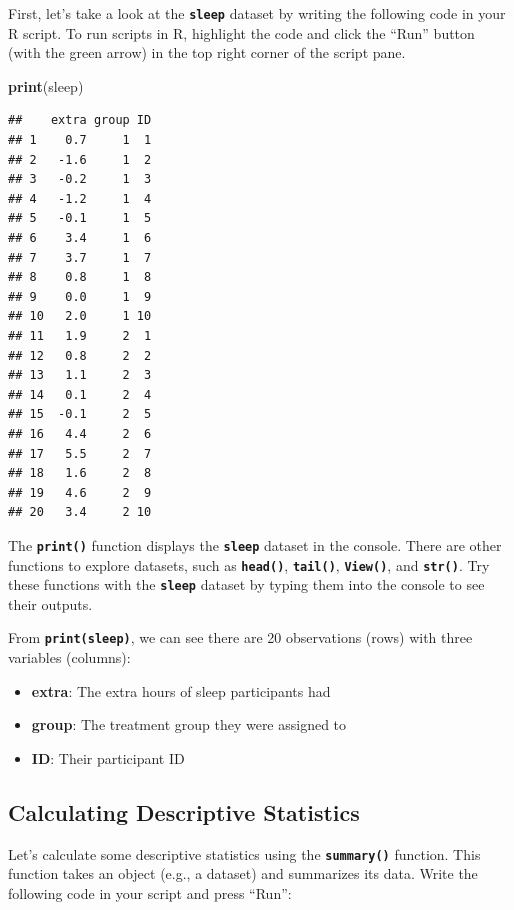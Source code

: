 \documentclass[
]{book}
\newenvironment{Shaded}{\begin{snugshade}}{\end{snugshade}}
\newcommand{\FunctionTok}[1]{\textcolor[rgb]{0.13,0.29,0.53}{\textbf{#1}}}
\newcommand{\NormalTok}[1]{#1}
\begin{document}
First, let's take a look at the \textbf{\texttt{sleep}} dataset by writing the following code in your R script. To run scripts in R, highlight the code and click the ``Run'' button (with the green arrow) in the top right corner of the script pane.

\begin{Shaded}
\begin{Highlighting}[]
\FunctionTok{print}\NormalTok{(sleep) }
\end{Highlighting}
\end{Shaded}

\begin{verbatim}
##    extra group ID
## 1    0.7     1  1
## 2   -1.6     1  2
## 3   -0.2     1  3
## 4   -1.2     1  4
## 5   -0.1     1  5
## 6    3.4     1  6
## 7    3.7     1  7
## 8    0.8     1  8
## 9    0.0     1  9
## 10   2.0     1 10
## 11   1.9     2  1
## 12   0.8     2  2
## 13   1.1     2  3
## 14   0.1     2  4
## 15  -0.1     2  5
## 16   4.4     2  6
## 17   5.5     2  7
## 18   1.6     2  8
## 19   4.6     2  9
## 20   3.4     2 10
\end{verbatim}

The \textbf{\texttt{print()}} function displays the \textbf{\texttt{sleep}} dataset in the console. There are other functions to explore datasets, such as \textbf{\texttt{head()}}, \textbf{\texttt{tail()}}, \textbf{\texttt{View()}}, and \textbf{\texttt{str()}}. Try these functions with the \textbf{\texttt{sleep}} dataset by typing them into the console to see their outputs.

From \textbf{\texttt{print(sleep)}}, we can see there are 20 observations (rows) with three variables (columns):

\begin{itemize}
\item
  \textbf{extra}: The extra hours of sleep participants had
\item
  \textbf{group}: The treatment group they were assigned to
\item
  \textbf{ID}: Their participant ID
\end{itemize}

\subsection{Calculating Descriptive Statistics}\label{calculating-descriptive-statistics}

Let's calculate some descriptive statistics using the \textbf{\texttt{summary()}} function. This function takes an object (e.g., a dataset) and summarizes its data. Write the following code in your script and press ``Run'':
\end{document}
